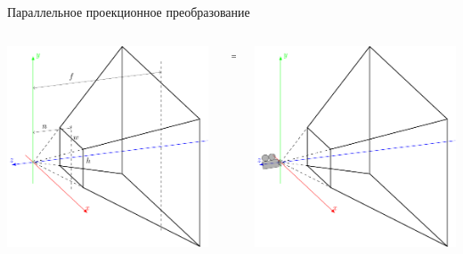\documentclass[10pt]{beamer}
\begin{document}
	\begin{frame}{Параллельное проекционное преобразование}
		\centering
		\begin{columns}
			\begin{column}{0.6\textwidth}
				\includegraphics[page=9,width=\textwidth]{cvv.pdf}
			\end{column}
			
			\begin{column}{0.1\textwidth}
				\centering
				$\Rightarrow$
			\end{column}
			
			\begin{column}{0.3\textwidth}
				\centering
				\includegraphics[page=2,width=\textwidth]{cvv_empty.pdf}
			\end{column}
		\end{columns}
	\end{frame}
	
\end{document}
